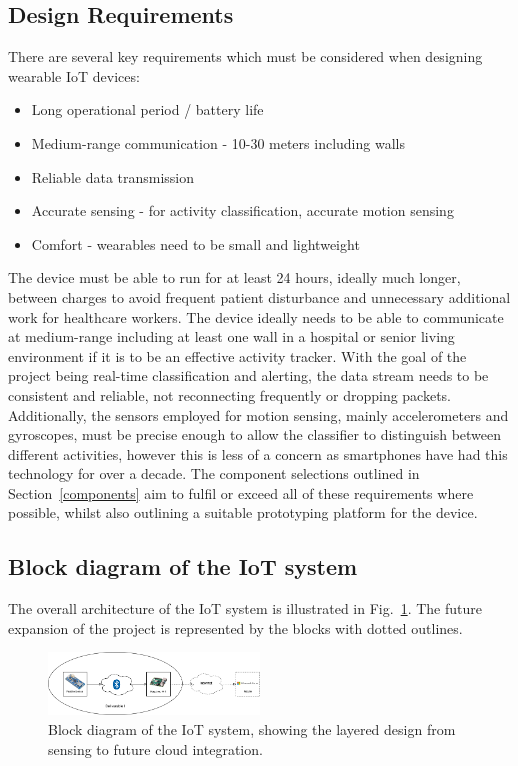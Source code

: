 \documentclass[conference]{IEEEtran}
\begin{document}
\subsection{Design Requirements}
There are several key requirements which must be considered when designing wearable IoT devices:
\begin{itemize}
	\item Long operational period / battery life
	\item Medium-range communication - 10-30 meters including walls
	\item Reliable data transmission
	\item Accurate sensing - for activity classification, accurate motion sensing
	\item Comfort - wearables need to be small and lightweight
\end{itemize}

The device must be able to run for at least 24 hours, ideally much longer, between charges to avoid frequent patient disturbance and unnecessary additional work for healthcare workers. The device ideally needs to be able to communicate at medium-range including at least one wall in a hospital or senior living environment if it is to be an effective activity tracker. With the goal of the project being real-time classification and alerting, the data stream needs to be consistent and reliable, not reconnecting frequently or dropping packets. Additionally, the sensors employed for motion sensing, mainly accelerometers and gyroscopes, must be precise enough to allow the classifier to distinguish between different activities, however this is less of a concern as smartphones have had this technology for over a decade. The component selections outlined in Section~\ref{components} aim to fulfil or exceed all of these requirements where possible, whilst also outlining a suitable prototyping platform for the device.

\subsection{Block diagram of the IoT system}
The overall architecture of the IoT system is illustrated in Fig.~\ref{fig:block_diagram}. The future expansion of the project is represented by the blocks with dotted outlines.

\begin{figure}[h]
	\centering
	\includegraphics[width=0.5\textwidth]{media/basic_diagram.png}
	\caption{Block diagram of the IoT system, showing the layered design from sensing to future cloud integration.}
	\label{fig:block_diagram}
\end{figure}
\end{document}
